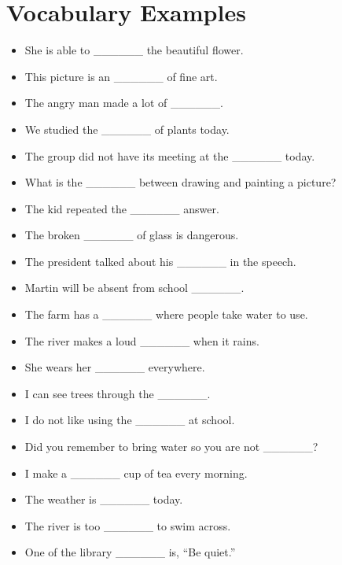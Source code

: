 \documentclass{article}
\begin{document}
\section*{Vocabulary Examples}
\begin{addmargin}[1em]{1em}
\begin{itemize}
    \item She is able to \_\_\_\_\_\_ the beautiful flower.
    \item This picture is an \_\_\_\_\_\_ of fine art.
    \item The angry man made a lot of \_\_\_\_\_\_.
    \item We studied the \_\_\_\_\_\_ of plants today.
    \item The group did not have its meeting at the \_\_\_\_\_\_ today.
    \item What is the \_\_\_\_\_\_ between drawing and painting a picture?
    \item The kid repeated the \_\_\_\_\_\_ answer.
    \item The broken \_\_\_\_\_\_ of glass is dangerous.
    \item The president talked about his \_\_\_\_\_\_ in the speech.
    \item Martin will be absent from school \_\_\_\_\_\_.
    \item The farm has a \_\_\_\_\_\_ where people take water to use.
    \item The river makes a loud \_\_\_\_\_\_ when it rains.
    \item She wears her \_\_\_\_\_\_ everywhere.
    \item I can see trees through the \_\_\_\_\_\_.
    \item I do not like using the \_\_\_\_\_\_ at school.
    \item Did you remember to bring water so you are not \_\_\_\_\_\_?
    \item I make a \_\_\_\_\_\_ cup of tea every morning.
    \item The weather is \_\_\_\_\_\_ today.
    \item The river is too \_\_\_\_\_\_ to swim across.
    \item One of the library \_\_\_\_\_\_ is, ``Be quiet.''
\end{itemize}
\end{addmargin}
\newpage
\end{document}

